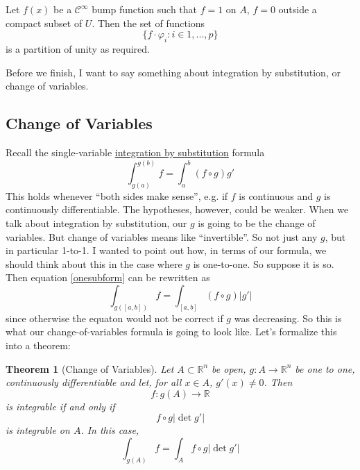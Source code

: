\documentclass{article}
\newtheorem{theorem}{Theorem}
\newcommand{\reals}[0]{\mathbb{R}}
\newcommand{\mc}[1]{\mathcal{#1}}
\begin{document}
Let \(f(x)\) be a \(\mc{C}^\infty\) bump function such that \(f = 1\) on \(A\), \(f = 0\) outside a compact subset of \(U\). Then the set of functions
\begin{equation}
  \{f \cdot \varphi_i : i \in 1,...,p\}
\end{equation}
is a partition of unity as required.

Before we finish, I want to say something about integration by substitution, or change of variables.

\subsection{Change of Variables}

Recall the single-variable \underline{integration by substitution} formula
\begin{equation}
  \int_{g(a)}^{g(b)} f = \int_a^b(f \circ g)g'
  \label{onesubform}
\end{equation}
This holds whenever ``both sides make sense'', e.g. if \(f\) is continuous and \(g\) is continuously differentiable. The hypotheses, however, could be weaker. When we talk about integration by substitution, our \(g\) is going to be the change of variables. But change of variables means like ``invertible''. So not just any \(g\), but in particular 1-to-1. I wanted to point out how, in terms of our formula, we should think about this in the case where \(g\) is one-to-one. So suppose it is so. Then equation \ref{onesubform} can be rewritten as
\begin{equation}
  \int_{g([a, b])}f = \int_{[a, b]}(f \circ g)|g'|
\end{equation}
since otherwise the equaton would not be correct if \(g\) was decreasing. So this is what our change-of-variables formula is going to look like. Let's formalize this into a theorem:

\begin{theorem}[Change of Variables]
  Let \(A \subset \reals^n\) be open, \(g: A \to \reals^n\) be one to one, continuously differentiable and let, for all \(x \in A\), \(g'(x) \neq 0\). Then
  \begin{equation}
    f : g(A) \to \reals
  \end{equation}
  is integrable if and only if
  \begin{equation}
    f \circ g|\det g'|
  \end{equation}
  is integrable on \(A\). In this case,
  \begin{equation}
    \int_{g(A)}f = \int_Af \circ g|\det g'|
  \end{equation}
  \label{covtheorem}
\end{theorem}
\end{document}
